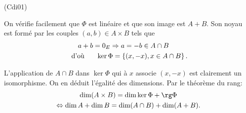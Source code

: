 \begin{tiny}(Cdi01)\end{tiny} 
On vérifie facilement que $\Phi$ est linéaire et que son image est $A+B$. Son noyau est formé par les couples $(a,b)\in A\times B$ tels que 
\begin{multline*}
  a+b = 0_E \Rightarrow a = -b \in A\cap B\hspace{0.5cm} \\ \text{ d'où }\hspace{0.5cm} \ker \Phi = \left\lbrace (x,-x), x\in A\cap B \right\rbrace .
\end{multline*}

L'application de $A\cap B$ dans $\ker \Phi$ qui à $x$ associe $(x,-x)$ est clairement un isomorphisme. On en déduit l'égalité des dimensions. Par le théorème du rang:
\begin{multline*}
\dim(A\times B) = \dim \ker \Phi + \rg \Phi \\ 
\Leftrightarrow \dim A + \dim B = \dim(A\cap B) + \dim(A+B).
\end{multline*}

